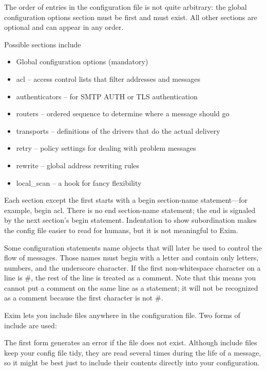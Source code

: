 The order of entries in the configuration file is not quite arbitrary:
the global configuration options section must be first and must exist.
All other sections are optional and can appear in any order.

Possible sections include

\begin{itemize}
\tightlist
\item
  Global configuration options (mandatory)
\item
  {acl} -- access control lists that filter addresses and messages
\item
  {authenticators} -- for SMTP AUTH or TLS authentication
\item
  {routers} -- ordered sequence to determine where a message should go
\item
  {transports} -- definitions of the drivers that do the actual delivery
\item
  {retry} -- policy settings for dealing with problem messages
\item
  {rewrite} -- global address rewriting rules
\item
  {local\_scan} -- a hook for fancy flexibility
\end{itemize}

Each section except the first starts with a {begin}{ section-name}
statement---for example, {begin acl}. There is no {end}{ section-name}
statement; the end is signaled by the next section's {begin} statement.
Indentation to show subordination makes the config file easier to read
for humans, but it is not meaningful to Exim.

Some configuration statements name objects that will later be used to
control the flow of messages. Those names must begin with a letter and
contain only letters, numbers, and the underscore character. If the
first non-whitespace character on a line is {\#}, the rest of the line
is treated as a comment. Note that this means you cannot put a comment
on the same line as a statement; it will not be recognized as a comment
because the first character is not {\#}.

Exim lets you include files anywhere in the configuration file. Two
forms of include are used:


The first form generates an error if the file does not exist. Although
include files keep your config file tidy, they are read several times
during the life of a message, so it might be best just to include their
contents directly into your configuration.

